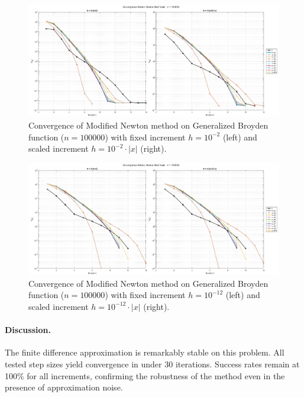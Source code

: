 \documentclass[a4paper,12pt]{article}
\begin{document}
	\begin{figure}[htbp]
		\centering
		\includegraphics[width=\textwidth]{../immagini/broyden_100k_h2.png}
		\caption{Convergence of Modified Newton method on Generalized Broyden function ($n=100000$) with fixed increment $h = 10^{-2}$ (left) and scaled increment $h = 10^{-2}\cdot|x|$ (right).}
		\label{fig:fd_broyden_100k_h2}
	\end{figure}
	
	\begin{figure}[htbp]
		\centering
		\includegraphics[width=\textwidth]{../immagini/broyden_100k_h12.png}
		\caption{Convergence of Modified Newton method on Generalized Broyden function ($n=100000$) with fixed increment $h = 10^{-12}$ (left) and scaled increment $h = 10^{-12}\cdot|x|$ (right).}
		\label{fig:fd_broyden_100k_h12}
	\end{figure}
	
	\paragraph{Discussion.}
	The finite difference approximation is remarkably stable on this problem. All tested step sizes yield convergence in under 30 iterations. Success rates remain at 100\% for all increments, confirming the robustness of the method even in the presence of approximation noise.
	
\end{document}
